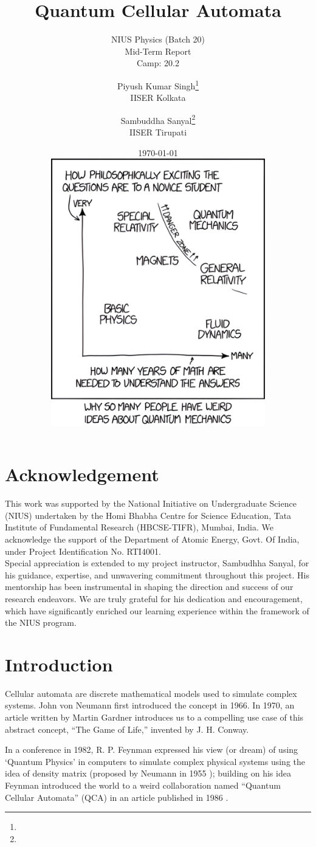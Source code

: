 \documentclass[11pt, oneside]{scrbook}
\title{Quantum Cellular Automata}
\subtitle{NIUS Physics (Batch 20) \\ Mid-Term Report \\ Camp: 20.2}
\author{
    Piyush Kumar Singh\thanks{\mailto{pks22ms027@iiserkol.ac.in}} \\ {\large IISER Kolkata} 
    \and
    Sambuddha Sanyal\thanks{\mailto{sambuddha.sanyal@iisertirupati.ac.in}} \\ {\large IISER Tirupati}
}
\date{
    \today \\[3ex]
    \includegraphics[width = 0.7\textwidth]{quantum-xkcd-better.png}
}
\begin{document}
\frontmatter
\begin{titlepage}
    \let\newpage\relax%
    \singhtitle
\end{titlepage}

\chapter*{Acknowledgement}

{\large\noindent
    This work was supported by the National Initiative on Undergraduate Science (NIUS) undertaken
    by the Homi Bhabha Centre for Science Education, Tata Institute of Fundamental Research
    (HBCSE-TIFR), Mumbai, India. We acknowledge the support of the Department of Atomic
    Energy, Govt. Of India, under Project Identification No. RTI4001.\\

    Special appreciation is extended to my project instructor, Sambudhha Sanyal, for his guidance, expertise, and unwavering commitment throughout this project. His mentorship has been instrumental in shaping the direction and success of our research endeavors. We are truly grateful for his dedication and encouragement, which have significantly enriched our learning experience within the framework of the NIUS program.
}

\tableofcontents

\mainmatter

\chapter{Introduction}


Cellular automata are discrete mathematical models used to simulate complex systems. John von Neumann first introduced the concept \cite{Neumann1966} in 1966. In 1970, an article written by Martin Gardner \cite{Gardner1970} introduces us to a compelling use case of this abstract concept, ``The Game of Life,'' invented by J. H. Conway.


In a conference in 1982, R. P. Feynman expressed his view (or dream) of using `Quantum Physics' in computers \cite{Feynman1982} to simulate complex physical systems using the idea of density matrix (proposed by Neumann in 1955 \cite{Neumann2018}); building on his idea Feynman introduced the world to a weird collaboration named ``Quantum Cellular Automata'' (QCA) in an article published in 1986 \cite{Feynman1986}.
\end{document}
